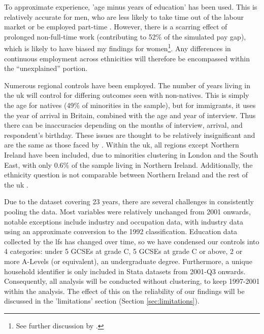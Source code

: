 \documentclass[class=article, crop=false]{standalone}
\begin{document}
To approximate experience, 'age minus years of education' has been used. This is relatively accurate for men, who are less likely to take time out of the labour market or be employed part-time \citep{Olsen}. However, there is a scarring effect of prolonged non-full-time work (contributing to 52\% of the simulated pay gap), which is likely to have biased my findings for women\footnote{See further discussion by \citet{Walby}.}. Any differences in continuous employment across ethnicities will therefore be encompassed within the \enquote{unexplained} portion.

Numerous regional controls have been employed. The number of years living in the \acrshort{uk} will control for differing outcomes seen with non-natives. This is simply the age for natives (49\% of minorities in the sample), but for immigrants, it uses the year of arrival in Britain, combined with the age and year of interview. Thus there can be inaccuracies depending on the months of interview, arrival, and respondent’s birthday. These issues are thought to be relatively insignificant and are the same as those faced by \citet{Berthoud}. Within the \acrshort{uk}, all regions except Northern Ireland have been included, due to minorities clustering in London and the South East, with only 0.6\% of the sample living in Northern Ireland. Additionally, the ethnicity question is not comparable between Northern Ireland and the rest of the \acrshort{uk} \citep{Longhi}.

Due to the dataset covering 23 years, there are several challenges in consistently pooling the data. Most variables were relatively unchanged from 2001 onwards, notable exceptions include industry and occupation data, with industry data using an approximate conversion to the 1992 classification. Education data collected by the \acrshort{lfs} has changed over time, so we have condensed our controls into 4 categories: under 5 GCSEs at grade C, 5 GCSEs at grade C or above, 2 or more A-Levels (or equivalent), an undergraduate degree. Furthermore, a unique household identifier is only included in Stata datasets from 2001-Q3 onwards. Consequently, all analysis will be conducted without clustering, to keep 1997-2001 within the analysis. The effect of this on the reliability of our findings will be discussed in the 'limitations' section (Section \ref{sec:limitations}).

\end{document}
